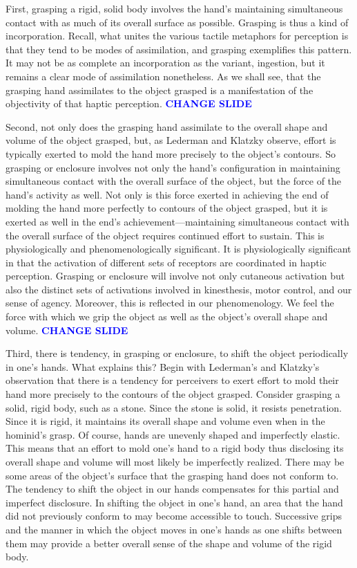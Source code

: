 \documentclass[12pt]{article}
\newcommand{\change}{\textcolor{blue}{\textbf{CHANGE SLIDE}}}
\begin{document}
First, grasping a rigid, solid body involves the hand's maintaining simultaneous contact with as much of its overall surface as possible. Grasping is thus a kind of incorporation. Recall, what unites the various tactile metaphors for perception is that they tend to be modes of assimilation, and grasping exemplifies this pattern. It may not be as complete an incorporation as the variant, ingestion, but it remains a clear mode of assimilation nonetheless. As we shall see, that the grasping hand assimilates to the object grasped is a manifestation of the objectivity of that haptic perception. \change

Second, not only does the grasping hand assimilate to the overall shape and volume of the object grasped, but, as Lederman and Klatzky observe, effort is typically exerted to mold the hand more precisely to the object's contours. So grasping or enclosure involves not only the hand's configuration in maintaining simultaneous contact with the overall surface of the object, but the force of the hand's activity as well. Not only is this force exerted in achieving the end of molding the hand more perfectly to contours of the object grasped, but it is exerted as well in the end's achievement---maintaining simultaneous contact with the overall surface of the object requires continued effort to sustain. This is physiologically and phenomenologically significant. It is physiologically significant in that the activation of different sets of receptors are coordinated in haptic perception. Grasping or enclosure will involve not only cutaneous activation but also the distinct sets of activations involved in kinesthesis, motor control, and our sense of agency. Moreover, this is reflected in our phenomenology. We feel the force with which we grip the object as well as the object's overall shape and volume. \change

Third, there is tendency, in grasping or enclosure, to shift the object periodically in one's hands. What explains this? Begin with Lederman's and Klatzky's observation that there is a tendency for perceivers to exert effort to mold their hand more precisely to the contours of the object grasped. Consider grasping a solid, rigid body, such as a stone. Since the stone is solid, it resists penetration. Since it is rigid, it maintains its overall shape and volume even when in the hominid's grasp. Of course, hands are unevenly shaped and imperfectly elastic. This means that an effort to mold one's hand to a rigid body thus disclosing its overall shape and volume will most likely be imperfectly realized. There may be some areas of the object's surface that the grasping hand does not conform to. The tendency to shift the object in our hands compensates for this partial and imperfect disclosure. In shifting the object in one's hand, an area that the hand did not previously conform to may become accessible to touch. Successive grips and the manner in which the object moves in one's hands as one shifts between them may provide a better overall sense of the shape and volume of the rigid body. 
\end{document}
